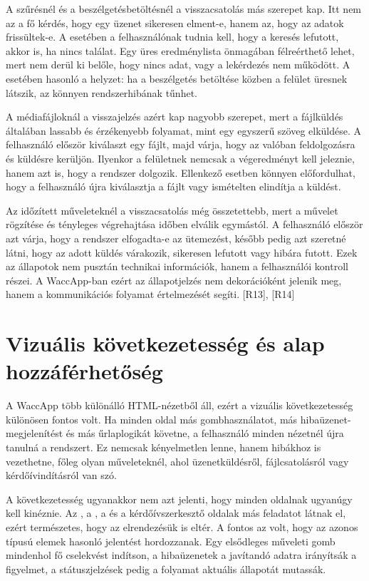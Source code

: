 A szűrésnél és a beszélgetésbetöltésnél a visszacsatolás más szerepet kap. Itt nem az a fő kérdés, hogy egy üzenet sikeresen elment-e, hanem az, hogy az adatok frissültek-e. A  esetében a felhasználónak tudnia kell, hogy a keresés lefutott, akkor is, ha nincs találat. Egy üres eredménylista önmagában félreérthető lehet, mert nem derül ki belőle, hogy nincs adat, vagy a lekérdezés nem működött. A  esetében hasonló a helyzet: ha a beszélgetés betöltése közben a felület üresnek látszik, az könnyen rendszerhibának tűnhet.

A médiafájloknál a visszajelzés azért kap nagyobb szerepet, mert a fájlküldés általában lassabb és érzékenyebb folyamat, mint egy egyszerű szöveg elküldése. A felhasználó először kiválaszt egy fájlt, majd várja, hogy az valóban feldolgozásra és küldésre kerüljön. Ilyenkor a felületnek nemcsak a végeredményt kell jeleznie, hanem azt is, hogy a rendszer dolgozik. Ellenkező esetben könnyen előfordulhat, hogy a felhasználó újra kiválasztja a fájlt vagy ismételten elindítja a küldést.

Az időzített műveleteknél a visszacsatolás még összetettebb, mert a művelet rögzítése és tényleges végrehajtása időben elválik egymástól. A felhasználó először azt várja, hogy a rendszer elfogadta-e az ütemezést, később pedig azt szeretné látni, hogy az adott küldés várakozik, sikeresen lefutott vagy hibára futott. Ezek az állapotok nem pusztán technikai információk, hanem a felhasználói kontroll részei. A WaccApp-ban ezért az állapotjelzés nem dekorációként jelenik meg, hanem a kommunikációs folyamat értelmezését segíti. [R13], [R14]

\section{Vizuális következetesség és alap hozzáférhetőség}

A WaccApp több különálló HTML-nézetből áll, ezért a vizuális következetesség különösen fontos volt. Ha minden oldal más gombhasználatot, más hibaüzenet-megjelenítést és más űrlaplogikát követne, a felhasználó minden nézetnél újra tanulná a rendszert. Ez nemcsak kényelmetlen lenne, hanem hibákhoz is vezethetne, főleg olyan műveleteknél, ahol üzenetküldésről, fájlcsatolásról vagy kérdőívindításról van szó.

A következetesség ugyanakkor nem azt jelenti, hogy minden oldalnak ugyanúgy kell kinéznie. Az , a , a  és a kérdőívszerkesztő oldalak más feladatot látnak el, ezért természetes, hogy az elrendezésük is eltér. A fontos az volt, hogy az azonos típusú elemek hasonló jelentést hordozzanak. Egy elsődleges műveleti gomb mindenhol fő cselekvést indítson, a hibaüzenetek a javítandó adatra irányítsák a figyelmet, a státuszjelzések pedig a folyamat aktuális állapotát mutassák.

